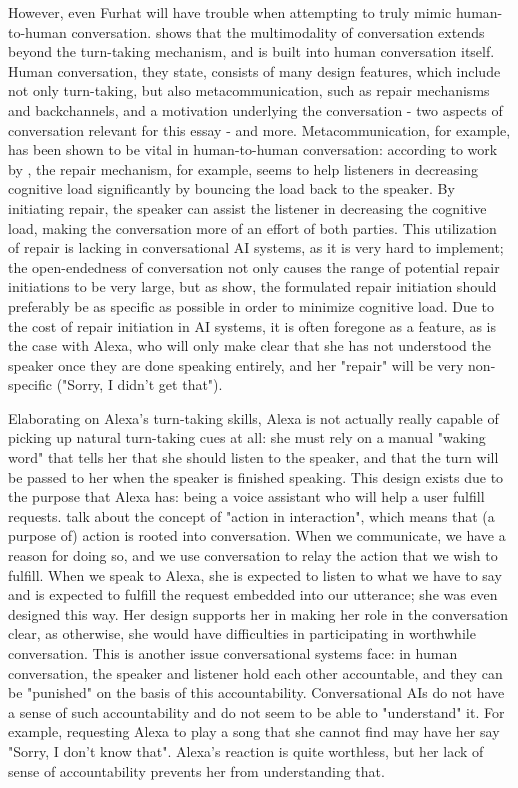 \documentclass[11pt]{article}
\begin{document}
However, even Furhat will have trouble when attempting to truly mimic human-to-human conversation.
\citet{levinson2019natural} shows that the multimodality of conversation extends beyond the turn-taking mechanism, and is built into human conversation itself.
Human conversation, they state, consists of many design features, which include not only turn-taking, but also metacommunication, such as repair mechanisms and backchannels, and a motivation underlying the conversation - two aspects of conversation relevant for this essay - and more.
Metacommunication, for example, has been shown to be vital in human-to-human conversation: according to work by \citet{dingemanse2024interactive}, the repair mechanism, for example, seems to help listeners in decreasing cognitive load significantly by bouncing the load back to the speaker.
By initiating repair, the speaker can assist the listener in decreasing the cognitive load, making the conversation more of an effort of both parties.
This utilization of repair is lacking in conversational AI systems, as it is very hard to implement; the open-endedness of conversation not only causes the range of potential repair initiations to be very large, but as \citeauthor{dingemanse2024interactive} show, the formulated repair initiation should preferably be as specific as possible in order to minimize cognitive load.
Due to the cost of repair initiation in AI systems, it is often foregone as a feature, as is the case with Alexa, who will only make clear that she has not understood the speaker once they are done speaking entirely, and her "repair" will be very non-specific ("Sorry, I didn't get that").

Elaborating on Alexa's turn-taking skills, Alexa is not actually really capable of picking up natural turn-taking cues at all: she must rely on a manual "waking word" that tells her that she should listen to the speaker, and that the turn will be passed to her when the speaker is finished speaking.
This design exists due to the purpose that Alexa has: being a voice assistant who will help a user fulfill requests.
\citet{enfield2017concept} talk about the concept of "action in interaction", which means that (a purpose of) action is rooted into conversation.
When we communicate, we have a reason for doing so, and we use conversation to relay the action that we wish to fulfill.
When we speak to Alexa, she is expected to listen to what we have to say and is expected to fulfill the request embedded into our utterance; she was even designed this way.
Her design supports her in making her role in the conversation clear, as otherwise, she would have difficulties in participating in worthwhile conversation.
This is another issue conversational systems face: in human conversation, the speaker and listener hold each other accountable, and they can be "punished" on the basis of this accountability.
Conversational AIs do not have a sense of such accountability and do not seem to be able to "understand" it.
For example, requesting Alexa to play a song that she cannot find may have her say "Sorry, I don't know that".
Alexa's reaction is quite worthless, but her lack of sense of accountability prevents her from understanding that.
\end{document}
